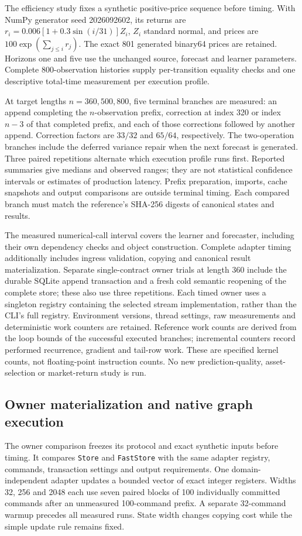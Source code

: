 \documentclass[11pt,a4paper]{article}
\theoremstyle{definition}\newtheorem{definition}[theorem]{Definition}
\begin{document}
The efficiency study fixes a synthetic positive-price sequence before timing. With NumPy generator seed 2026092602, its returns are $r_i=0.006[1+0.3\sin(i/31)]Z_i$, $Z_i$ standard normal, and prices are $100\exp(\sum_{j\le i}r_j)$. The exact 801 generated binary64 prices are retained. Horizons one and five use the unchanged source, forecast and learner parameters. Complete 800-observation histories supply per-transition equality checks and one descriptive total-time measurement per execution profile.

At target lengths $n=360,500,800$, five terminal branches are measured: an append completing the $n$-observation prefix, correction at index 320 or index $n-3$ of that completed prefix, and each of those corrections followed by another append. Correction factors are $33/32$ and $65/64$, respectively. The two-operation branches include the deferred variance repair when the next forecast is generated. Three paired repetitions alternate which execution profile runs first. Reported summaries give medians and observed ranges; they are not statistical confidence intervals or estimates of production latency. Prefix preparation, imports, cache snapshots and output comparisons are outside terminal timing. Each compared branch must match the reference's SHA-256 digests of canonical states and results.

The measured numerical-call interval covers the learner and forecaster, including their own dependency checks and object construction. Complete adapter timing additionally includes ingress validation, copying and canonical result materialization. Separate single-contract owner trials at length 360 include the durable SQLite append transaction and a fresh cold semantic reopening of the complete store; these also use three repetitions. Each timed owner uses a singleton registry containing the selected stream implementation, rather than the CLI's full registry. Environment versions, thread settings, raw measurements and deterministic work counters are retained. Reference work counts are derived from the loop bounds of the successful executed branches; incremental counters record performed recurrence, gradient and tail-row work. These are specified kernel counts, not floating-point instruction counts. No new prediction-quality, asset-selection or market-return study is run.

\subsection{Owner materialization and native graph execution}\label{sec:fastownerprotocol}
The owner comparison freezes its protocol and exact synthetic inputs before timing. It compares \texttt{Store} and \texttt{FastStore} with the same adapter registry, commands, transaction settings and output requirements. One domain-independent adapter updates a bounded vector of exact integer registers. Widths 32, 256 and 2048 each use seven paired blocks of 100 individually committed commands after an unmeasured 100-command prefix. A separate 32-command warmup precedes all measured runs. State width changes copying cost while the simple update rule remains fixed.
\end{document}
